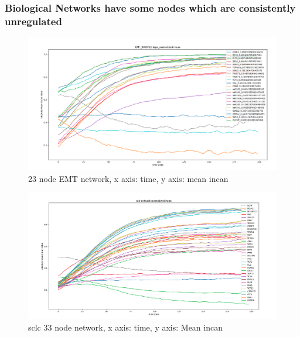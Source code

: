 \documentclass[t]{beamer}
\begin{document}
\begin{frame}
	\frametitle{Biological Networks have some nodes which are consistently unregulated}

\begin{figure}[H]
\centering 
\includegraphics[scale=0.15]{img/emtracipe23incanthreestate.png}

\caption{23 node EMT network, x axis: time, y axis: mean incan}
\end{figure}	
\end{frame}


\begin{frame}
\begin{figure}[H]
\centering

\includegraphics[scale=0.15]{img/sclscnormalizedincan200.png}
\caption{sclc 33 node network, x axis: time, y axis: Mean incan}
\end{figure}
\end{frame}
\end{document}

